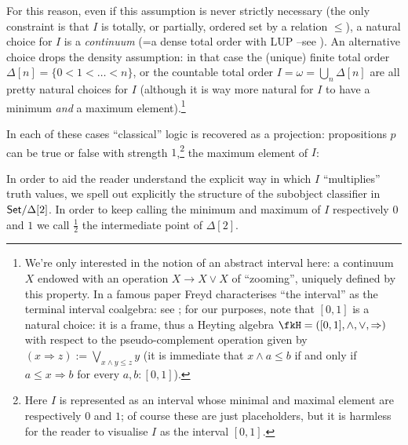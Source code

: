 For this reason, even if this assumption is never strictly necessary (the only constraint is that $I$ is totally, or partially, ordered set by a relation $\le$), a natural choice for $I$ is a \emph{continuum} (=a dense total order with LUP --see \cite{moschovakis2009descriptive}). An alternative choice drops the density assumption: in that case the (unique) finite total order $\Delta[n] = \{0 < 1 <\dots < n\}$, or the countable total order $I=\omega = \bigcup_n \Delta[n]$ are all pretty natural choices for $I$ (although it is way more natural for $I$ to have a minimum \emph{and} a maximum element).\footnote{We're only interested in the notion of an abstract interval here: a continuum $X$ endowed with an operation $X \to X \vee X$ of ``zooming'', uniquely defined by this property. In a famous paper Freyd characterises ``the interval'' as the terminal interval coalgebra: see \cite[§1]{freyd2008algebraic}; for our purposes, note that $[0,1]$ is a natural choice: it is a frame, thus a Heyting algebra $\fkH =([0,1],\land,\lor,\Rightarrow)$ with respect to the pseudo-complement operation given by $(x \Rightarrow z) := \bigvee_{x\land y \le z} y$ (it is immediate that $x \land a \le b$ if and only if $a \le x \Rightarrow b$ for every $a,b: [0,1]$).} 
\begin{remark}\label{fig_Omega}
	In each of these cases ``classical'' logic is recovered as a projection: propositions $p$ can be true or false with strength $1$,\footnote{Here $I$ is represented as an interval whose minimal and maximal element are respectively $0$ and $1$; of course these are just placeholders, but it is harmless for the reader to visualise $I$ as the interval $[0,1]$.} the maximum element of $I$:
\begin{center}
\end{center}
\end{remark}
In order to aid the reader understand the explicit way in which $I$ ``multiplies'' truth values, we spell out explicitly the structure of the subobject classifier in $\mathsf{Set}/\Delta[2]$. In order to keep calling the minimum and maximum of $I$ respectively $0$ and $1$ we call $\frac{1}{2}$ the intermediate point of $\Delta[2]$.
